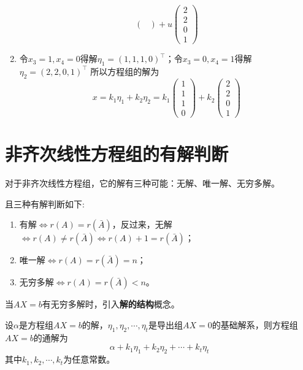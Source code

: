 \begin{solution}
\begin{enumerate}[itemindent=1em,label=\textbf{\textsf{方法}}\arabic*]
\[\begin{pmatrix}
                  \end{pmatrix}
                  + u
                  \begin{pmatrix}
                      2 \\2\\0\\1
                  \end{pmatrix}
              \]
        \item 令$x_3=1,x_4=0$得解$\eta_1 = (1,1,1,0)^\intercal$；令$x_3=0,x_4=1$得解$\eta_2=(2,2,0,1)^\intercal$
              所以方程组的解为
              \[
                  x= k_1\eta_1+k_2\eta_2 =
                  k_1
                  \begin{pmatrix}
                      1 \\1\\1\\0
                  \end{pmatrix}
                  +
                  k_2
                  \begin{pmatrix}
                      2 \\2\\0\\1
                  \end{pmatrix}
              \]
    \end{enumerate}
\end{solution}

\section{非齐次线性方程组的有解判断}
对于非齐次线性方程组，它的解有三种可能：无解、唯一解、无穷多解。
\begin{theorem}
    且三种有解判断如下:
    \begin{enumerate}[(1)]
        \item 有解$\iff r(A)=r(\bar{A})$，反过来，无解$\iff r(A)\neq r(\bar{A}) \iff r(A)+1 = r(\bar{A})$；
        \item 唯一解$\iff r(A)=r(\bar{A}) = n$；
        \item 无穷多解$\iff r(A)=r(\bar{A})<n$。
    \end{enumerate}
\end{theorem}

当$AX=b$有无穷多解时，引入\textbf{\textsf{解的结构}}概念。
\begin{theorem}
    设$\alpha$是方程组$AX=b$的解，$\eta_1,\eta_2,\cdots,\eta_t$是导出组$AX=0$的基础解系，则方程组$AX=b$的通解为
    \[ \alpha + k_1\eta_1 + k_2\eta_2 + \cdots + k_t\eta_t \]
    其中$k_1,k_2,\cdots,k_t$为任意常数。
\end{theorem}

